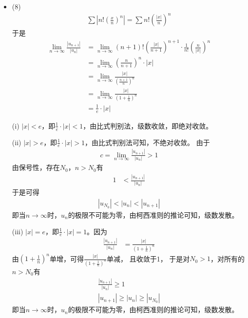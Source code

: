 \documentclass{article}
\begin{document}
\begin{itemize}
  \item (8)
        \begin{align*}
          \sum \left|n! \left(\frac{x}{n}\right)^n\right|
          = \sum n! \left(\frac{|x|}{n}\right)^n
        \end{align*}
        于是
        \begin{align*}
          \lim\limits_{n \to \infty} \frac{|u_{n + 1}|}{|u_n|}
           & = \lim\limits_{n \to \infty} (n + 1)! \left(\frac{|x|}{n + 1}\right)^{n + 1} \cdot \frac{1}{n!} \left(\frac{n}{|x|}\right)^n \\
           & = \lim\limits_{n \to \infty} \left(\frac{n}{n+1}\right)^n \cdot |x|                                                          \\
           & = \lim\limits_{n \to \infty} \frac{|x|}{\left(\frac{n+1}{n}\right)^n}                                                        \\
           & = \lim\limits_{n \to \infty} \frac{|x|}{\left(1 + \frac{1}{n}\right)^n}                                                      \\
           & = \frac{1}{e} \cdot |x|
        \end{align*}

        (i) $|x|<e$，即$\frac{1}{e} \cdot |x| < 1$，由比式判别法，级数收敛，即绝对收敛。

        (ii) $|x| > e$，即$\frac{1}{e} \cdot |x| > 1$，由比式判别法可知，不绝对收敛。
        由于
        \begin{align*}
          c = \lim\limits_{n \to \infty} \frac{|u_{n+1}|}{|u_n|} > 1
        \end{align*}
        由保号性，存在$N_0$，$n > N_0$有
        \begin{align*}
          1 & < \frac{|u_{n+1}|}{|u_n|}
        \end{align*}
        于是可得
        \begin{align*}
          |u_{N_0}| < |u_n|  < |u_{n+1}|
        \end{align*}
        即当$n \to \infty$时，$u_n$的极限不可能为零，由柯西准则的推论可知，级数发散。

        (iii) $|x| = e$，即$\frac{1}{e} \cdot |x| = 1$。因为
        \begin{align*}
          \frac{|u_{n + 1}|}{|u_n|} & = \frac{|x|}{\left(1 + \frac{1}{n}\right)^n}
        \end{align*}
        由$\left(1 + \frac{1}{n}\right)^n$单增，可得$\frac{|x|}{\left(1 + \frac{1}{n}\right)^n}$单减，
        且收敛于1，
        于是对$N_0 > 1$，对所有的$n > N_0$有
        \begin{align*}
          \frac{|u_{n + 1}|}{|u_n|} \geq 1 \\
          |u_{n + 1}| \geq |u_n| \geq |u_{N_0}|
        \end{align*}
        即当$n \to \infty$时，$u_n$的极限不可能为零，由柯西准则的推论可知，级数发散。


\end{itemize}
\end{document}
